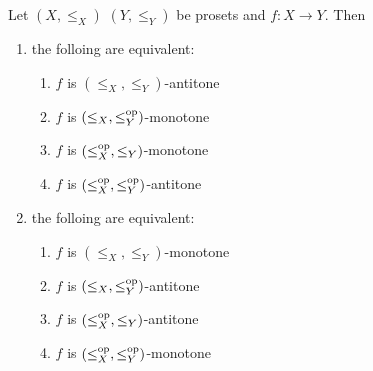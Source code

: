 \documentclass{book}
\begin{document}
	\begin{ex} 
		Let $(X, \leq_X)$ $(Y, \leq_Y)$ be prosets and $f:X \rightarrow Y$. Then 
		\begin{enumerate}
			\item 
			the folloing are equivalent: 
			\begin{enumerate}
				\item $f$ is $(\leq_X, \leq_Y)$-antitone 
				\item $f$ is $(\leq_X, \leq^{\text{op}}_Y)$-monotone
				\item $f$ is $(\leq^{\text{op}}_X, \leq_Y)$-monotone
				\item $f$ is $(\leq^{\text{op}}_X, \leq^{\text{op}}_Y)$-antitone
			\end{enumerate}
			\item the folloing are equivalent: 
			\begin{enumerate}
				\item $f$ is $(\leq_X, \leq_Y)$-monotone 
				\item $f$ is $(\leq_X, \leq^{\text{op}}_Y)$-antitone
				\item $f$ is $(\leq^{\text{op}}_X, \leq_Y)$-antitone
				\item $f$ is $(\leq^{\text{op}}_X, \leq^{\text{op}}_Y)$-monotone 
			\end{enumerate}
		\end{enumerate}
	\end{ex}
	
\end{document}
